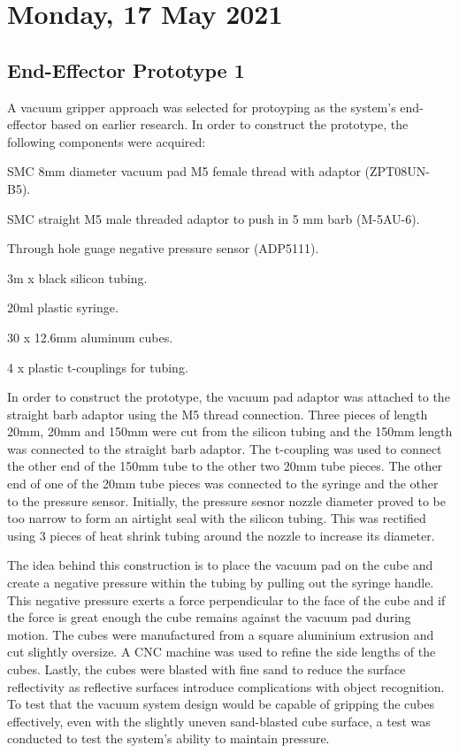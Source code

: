 \pendsign

\section[2021/05/17]{Monday, 17 May 2021}

\subsection{End-Effector Prototype 1}

A vacuum gripper approach was selected for protoyping as the system's end-effector based on earlier research. In order to construct the prototype, the following components were acquired:

\begin{compactitem}
    \item SMC 8mm diameter vacuum pad M5 female thread with adaptor (ZPT08UN-B5).
    \item SMC straight M5 male threaded adaptor to push in 5 mm barb (M-5AU-6).
    \item Through hole guage negative pressure sensor (ADP5111).
    \item 3m x black silicon tubing.
    \item 20ml plastic syringe.
    \item 30 x 12.6mm aluminum cubes.
    \item 4 x plastic t-couplings for tubing.
\end{compactitem}

In order to construct the prototype, the vacuum pad adaptor was attached to the straight barb adaptor using the M5 thread connection. Three pieces of length 20mm, 20mm and 150mm were cut from the silicon tubing and the 150mm length was connected to the straight barb adaptor. The t-coupling was used to connect the other end of the 150mm tube to the other two 20mm tube pieces. The other end of one of the 20mm tube pieces was connected to the syringe and the other to the pressure sensor. Initially, the pressure sesnor nozzle diameter proved to be too narrow to form an airtight seal with the silicon tubing. This was rectified using 3 pieces of heat shrink tubing around the nozzle to increase its diameter. 

The idea behind this construction is to place the vacuum pad on the cube and create a negative pressure within the tubing by pulling out the syringe handle. This negative pressure exerts a force perpendicular to the face of the cube and if the force is great enough the cube remains against the vacuum pad during motion. The cubes were manufactured from a square aluminium extrusion and cut slightly oversize. A CNC machine was used to refine the side lengths of the cubes. Lastly, the cubes were blasted with fine sand to reduce the surface reflectivity as reflective surfaces introduce complications with object recognition. To test that the vacuum system design would be capable of gripping the cubes effectively, even with the slightly uneven sand-blasted cube surface, a test was conducted to test the system's ability to maintain pressure.

